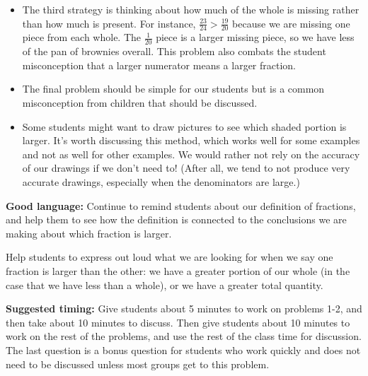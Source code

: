 \documentclass[nooutcomes,noauthor]{ximera}
\begin{document}
\begin{instructorNotes}
\begin{itemize}
	\item The third strategy is thinking about how much of the whole is missing rather than how much is present. For instance, $\frac{23}{24}>\frac{19}{20}$ because we are missing one piece from each whole. The $\frac{1}{20}$ piece is a larger missing piece, so we have less of the pan of brownies overall. This problem also combats the student misconception that a larger numerator means a larger fraction.
	\item The final problem should be simple for our students but is a common misconception from children that should be discussed.
	\item Some students might want to draw pictures to see which shaded portion is larger. It's worth discussing this method, which works well for some examples and not as well for other examples. We would rather not rely on the accuracy of our drawings if we don't need to! (After all, we tend to not produce very accurate drawings, especially when the denominators are large.)
\end{itemize}




{\bf Good language:}  Continue to remind students about our definition of fractions, and help them to see how the definition is connected to the conclusions we are making about which fraction is larger.

Help students to express out loud what we are looking for when we say one fraction is larger than the other: we have a greater portion of our whole (in the case that we have less than a whole), or we have a greater total quantity.



{\bf Suggested timing:} Give students about 5 minutes to work on problems 1-2, and then take about 10 minutes to discuss. Then give students about 10 minutes to work on the rest of the problems, and use the rest of the class time for discussion. The last question is a bonus question for students who work quickly and does not need to be discussed unless most groups get to this problem.




\end{instructorNotes}
\end{document}
